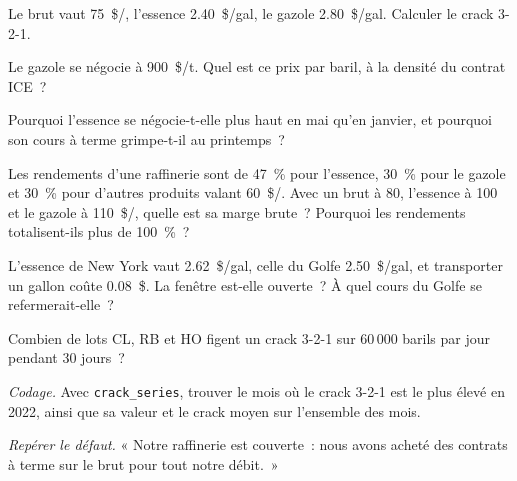 \begin{exercise}[$\star$]\label{exo:m3:refined-products-and-cracks:1}
Le brut vaut \qty{75}{\$/\barrel}, l'essence \qty{2.40}{\$/gal}, le gazole \qty{2.80}{\$/gal}. Calculer
le crack 3-2-1.
\end{exercise}

\begin{exercise}[$\star$]\label{exo:m3:refined-products-and-cracks:2}
Le gazole se négocie à \qty{900}{\$/t}. Quel est ce prix par baril, à la densité du
contrat ICE~?
\end{exercise}

\begin{exercise}[$\star$]\label{exo:m3:refined-products-and-cracks:3}
Pourquoi l'essence se négocie-t-elle plus haut en mai qu'en janvier, et pourquoi son cours à terme
grimpe-t-il au printemps~?
\end{exercise}

\begin{exercise}[$\star\star$]\label{exo:m3:refined-products-and-cracks:4}
Les rendements d'une raffinerie sont de 47~\% pour l'essence, 30~\% pour le gazole et 30~\% pour d'autres produits valant
\qty{60}{\$/\barrel}. Avec un brut à \qty{80}{}, l'essence à \qty{100}{} et le gazole à
\qty{110}{\$/\barrel}, quelle est sa marge brute~? Pourquoi les rendements totalisent-ils plus de 100~\%~?
\end{exercise}

\begin{exercise}[$\star\star$]\label{exo:m3:refined-products-and-cracks:5}
L'essence de New York vaut \qty{2.62}{\$/gal}, celle du Golfe \qty{2.50}{\$/gal}, et transporter
un gallon coûte \qty{0.08}{\$}. La fenêtre est-elle ouverte~? À quel cours du Golfe se refermerait-elle~?
\end{exercise}

\begin{exercise}[$\star\star$]\label{exo:m3:refined-products-and-cracks:6}
Combien de lots CL, RB et HO figent un crack 3-2-1 sur 60\,000 barils par jour pendant 30 jours~?
\end{exercise}

\begin{exercise}[$\star\star\star$]\label{exo:m3:refined-products-and-cracks:7}
\emph{Codage.} Avec \texttt{crack\_series}, trouver le mois où le crack 3-2-1 est le plus élevé en
2022, ainsi que sa valeur et le crack moyen sur l'ensemble des mois.
\end{exercise}

\begin{exercise}[$\star\star\star$]\label{exo:m3:refined-products-and-cracks:8}
\emph{Repérer le défaut.} « Notre raffinerie est couverte~: nous avons acheté des contrats à terme sur le brut pour
tout notre débit.~»
\end{exercise}

